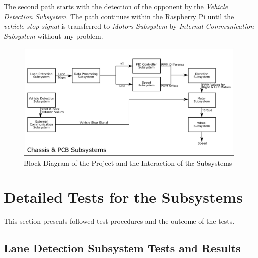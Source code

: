 \documentclass[a4paper,12pt]{article}
\begin{document}
	The second path starts with the detection of the opponent by the \textit{Vehicle Detection Subsystem}. The path continues within the Raspberry Pi until the \textit{vehicle stop signal} is transferred to \textit{Motors Subsystem} by \textit{Internal Communication Subsystem} without any problem.

	\begin{figure}[h]
		\includegraphics[width=\textwidth,center]{images/subsys_block}
		\caption{Block Diagram of the Project and the Interaction of the Subsystems}\label{fig:subsys-block}
	\end{figure}







\section{Detailed Tests for the Subsystems}\label{test_sec}
	This section presents followed test procedures and the outcome of the tests.

\subsection {Lane Detection Subsystem Tests and Results}	
\end{document}
